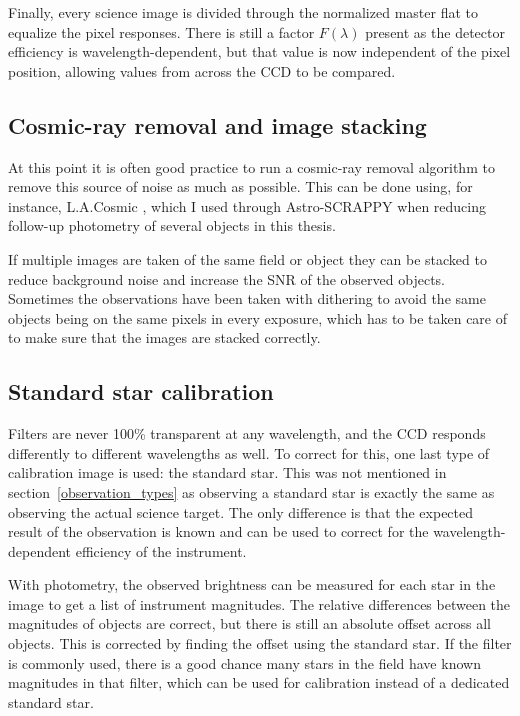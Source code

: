 \documentclass[a4paper,oneside,12pt, class=Latex/Classes/PhDthesisPSnPDF, crop=false]{standalone}
\begin{document}
Finally, every science image is divided through the normalized master flat to equalize the pixel responses. There is still a factor $F(\lambda)$ present as the detector efficiency is wavelength-dependent, but that value is now independent of the pixel position, allowing values from across the CCD to be compared.

\subsection{Cosmic-ray removal and image stacking}
At this point it is often good practice to run a cosmic-ray removal algorithm to remove this source of noise as much as possible. This can be done using, for instance, L.A.Cosmic \citep{lacosmic}, which I used through Astro-SCRAPPY \citep{astroSCRAPPY} when reducing follow-up photometry of several objects in this thesis.

If multiple images are taken of the same field or object they can be stacked to reduce background noise and increase the SNR of the observed objects. Sometimes the observations have been taken with dithering to avoid the same objects being on the same pixels in every exposure, which has to be taken care of to make sure that the images are stacked correctly.

\subsection{Standard star calibration}
Filters are never 100\% transparent at any wavelength, and the CCD responds differently to different wavelengths as well. To correct for this, one last type of calibration image is used: the standard star. This was not mentioned in section~\ref{observation_types} as observing a standard star is exactly the same as observing the actual science target. The only difference is that the expected result of the observation is known and can be used to correct for the wavelength-dependent efficiency of the instrument.

With photometry, the observed brightness can be measured for each star in the image to get a list of instrument magnitudes. The relative differences between the magnitudes of objects are correct, but there is still an absolute offset across all objects. This is corrected by finding the offset using the standard star. If the filter is commonly used, there is a good chance many stars in the field have known magnitudes in that filter, which can be used for calibration instead of a dedicated standard star.
\end{document}
